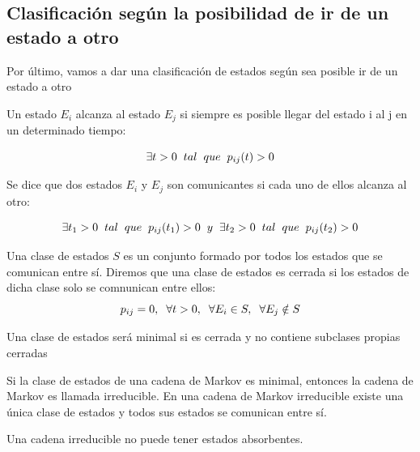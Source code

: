 \documentclass[12pt,a4paper]{article}
\begin{document}
       \subsection{Clasificación según la posibilidad de ir de un estado a otro}
  Por último, vamos a dar una clasificación de estados según sea posible ir de un estado a otro
   \begin{definition}
   	Un estado $E_{i}$ alcanza al estado $E_{j}$ si siempre es posible llegar del estado i al j en un determinado tiempo:
   	
   	\begin{equation*}
   		\exists t > 0 \hspace{0.2cm}tal \hspace{0.2cm} que \hspace{0.2cm} p_{ij}(t) > 0
   	\end{equation*}
   	
   \end{definition}
   
   \begin{definition}
   	Se dice que dos estados $E_{i}$ y $E_{j}$ son comunicantes si cada uno de ellos alcanza al otro:
   	
   	\begin{equation*}
   		\exists t_{1} > 0 \hspace{0.2cm}tal \hspace{0.2cm} que \hspace{0.2cm} p_{ij}(t_{1}) > 0 \hspace{0.2cm} y \hspace{0.2cm} \exists t_{2} > 0 \hspace{0.2cm}tal \hspace{0.2cm} que \hspace{0.2cm} p_{ij}(t_{2}) > 0
   	\end{equation*}
   \end{definition}
    \begin{definition}
   		Una clase de estados $S$ es un conjunto formado por todos los estados que se comunican entre sí. Diremos que una clase de estados es cerrada si los estados de dicha clase solo se comnunican entre ellos: $$p_{ij}=0, \hspace{0.2cm} \forall t >0,\hspace{0.2cm} \forall E_{i} \in S,\hspace{0.2cm} \forall E_{j} \notin S$$
   \end{definition}
   \begin{definition}
   Una clase de estados será minimal si es cerrada y no contiene subclases propias cerradas
   \end{definition}
   \begin{definition}
   	Si la clase de estados de una cadena de Markov es minimal, entonces la cadena de Markov es llamada irreducible. 
   	En una cadena de Markov irreducible existe una única clase de estados y todos sus estados se comunican entre sí.
   \end{definition}
   \begin{prop}
   	Una cadena irreducible no puede tener estados absorbentes. 
   \end{prop}
      
\end{document}
